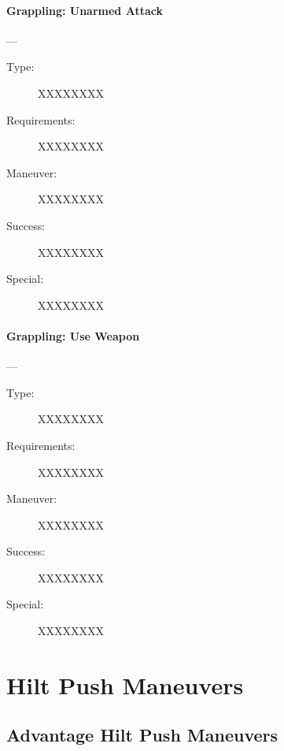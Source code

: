 \documentclass[oneside,11pt,english]{book}
\begin{document}
\paragraph{\large\label{man:Grappling: Unarmed Attack}Grappling: Unarmed Attack}---\quad{\large[??????]}
\vspace{-10pt}\begin{description} 
\item [Type:] XXXXXXXX 
\item [Requirements:] XXXXXXXX 
\item [Maneuver:] XXXXXXXX 
\item [Success:] XXXXXXXX 
\item [Special:] XXXXXXXX 
\end{description}
\paragraph{\large\label{man:Grappling: Use Weapon}Grappling: Use Weapon}---\quad{\large[??????]}
\vspace{-10pt}\begin{description} 
\item [Type:] XXXXXXXX 
\item [Requirements:] XXXXXXXX 
\item [Maneuver:] XXXXXXXX 
\item [Success:] XXXXXXXX 
\item [Special:] XXXXXXXX 
\end{description}
\section{Hilt Push Maneuvers}
\subsection{Advantage Hilt Push Maneuvers}
\end{document}
